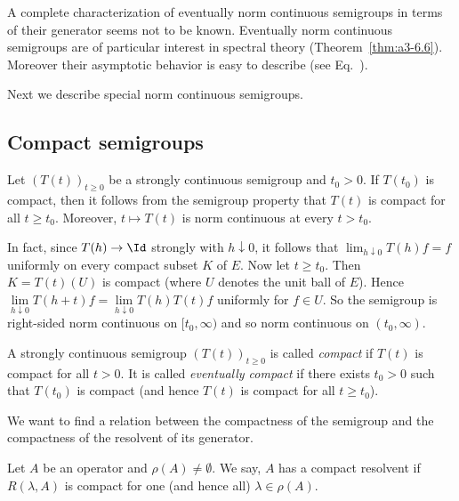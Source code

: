 A complete characterization of eventually norm continuous semigroups in terms of their generator seems not to be known.
Eventually norm continuous semigroups are of particular interest in spectral theory (\cf Theorem~\ref{thm:a3-6.6}).
Moreover their asymptotic behavior is easy to describe (see Eq.~).

Next we describe special norm continuous semigroups.
\subsection{Compact semigroups} \label{subsec:a2-1.se7}%
Let $(T(t))_{t\geq 0}$ be a strongly continuous semigroup and $t_0 > 0$.
If\/ $T(t_0)$ is compact, then it follows from the semigroup property that $T(t)$ is compact for all $t \geq t_0$.
Moreover, $t \mapsto T(t)$ is norm continuous at every $t > t_0$.

In fact, since $T(h) \to \Id $ strongly with $h \downarrow 0$, it follows that $\lim_{h \downarrow 0} T(h)f = f$ uniformly on every compact subset $K$ of\/ $E$.
Now let $t \geq t_0$.
Then $K = T(t)(U)$ is compact (where $U$ denotes the unit ball of\/ $E$).
Hence $\lim \limits_{h \downarrow 0} T(h+t)f = \lim \limits_{h \downarrow 0} T(h)T(t)f$ uniformly for $f \in U$.
So the semigroup is right-sided norm continuous on $[t_0,\infty)$ and so norm continuous on $(t_0,\infty)$.

\begin{definition}\label{def:a2-1.22}
A strongly continuous semigroup $(T(t))_{t\geq 0}$ is called \emph{compact} if\/ $T(t)$ is compact for all $t > 0$. It is called \emph{eventually compact} if there exists $t_0 > 0$ such that $T(t_0)$ is compact (and hence $T(t)$ is compact for all $t \geq t_0$).
\end{definition}

We want to find a relation between the compactness of the semigroup and the compactness of the resolvent of its generator.

\begin{definition}\label{def:a2-1.23}

Let $A$ be an operator and $\rho(A) \neq \emptyset$.
We say, $A$ has a compact resolvent if\/ $R(\lambda,A)$ is compact for one (and hence all) $\lambda \in \rho(A)$.
\end{definition}

